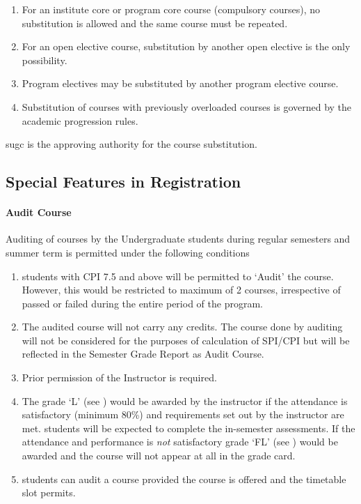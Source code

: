 \begin{enumerate}[leftmargin=15mm, resume]
    \item For an institute core or program core course (compulsory courses), no substitution is allowed and the same course must be repeated. 
    \item For an open elective course, substitution by another open elective is the only possibility. 
    \item Program electives may be substituted by another program elective course.
    \item Substitution of courses with previously overloaded courses is governed by the academic progression rules.
\end{enumerate}

\acrshort{sugc} is the approving authority for the course substitution.

\subsection{Special Features in Registration}

\paragraph{Audit Course} Auditing of courses by the Undergraduate \glspl{student} during regular semesters and summer term is permitted under the following conditions

\begin{enumerate}[leftmargin=15mm]
    \item \Glspl{student} with CPI 7.5 and above will be permitted to ‘Audit' the course. However, this would be restricted to maximum of 2 courses, irrespective of passed or failed during the entire period of the program. 
    \item The audited course will not carry any credits. The course done by auditing will not be considered for the purposes of calculation of SPI/CPI but will be reflected in the Semester Grade Report as Audit Course. 
    \item Prior permission of the Instructor is required. 
    \item The grade ‘L' (see ) would be awarded by the instructor if the attendance is satisfactory (minimum 80\%) and requirements set out by the instructor are met. \Glspl{student} will be expected to complete the in-semester assessments. If the attendance and performance is \textit{not} satisfactory grade ‘FL’ (see ) would be awarded and the course will not appear at all in the grade card. 
    \item \Glspl{student} can audit a course provided the course is offered and the timetable slot permits. 
\end{enumerate}

